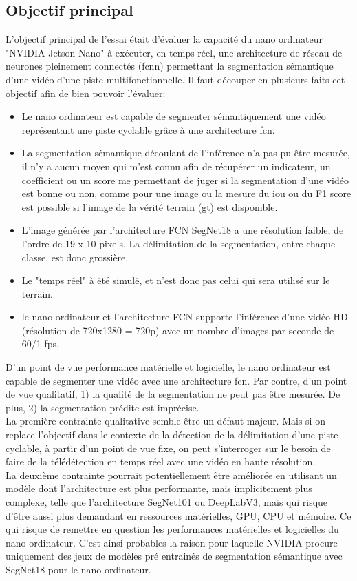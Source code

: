﻿\subsection{Objectif principal}
\noindent L'objectif principal de l'essai était d'évaluer la capacité du nano ordinateur "NVIDIA Jetson Nano" à exécuter, en temps réel, une architecture de réseau de neurones pleinement connectés (\acrshort{fcnn}) permettant la segmentation sémantique d'une vidéo d'une piste multifonctionnelle. Il faut découper en plusieurs faits cet objectif afin de bien pouvoir l'évaluer: 
\begin{itemize}
   \item Le nano ordinateur est capable de segmenter sémantiquement une vidéo représentant une piste cyclable grâce à une architecture \acrshort{fcn}. 
   \item La segmentation sémantique découlant de l'inférence n'a pas pu être mesurée, il n'y a aucun moyen qui m'est connu afin de récupérer un indicateur, un coefficient ou un score me permettant de juger si la segmentation d'une vidéo est bonne ou non, comme pour une image ou la mesure du \acrshort{iou} ou du F1 score est possible si l'image de la vérité terrain (\acrshort{gt}) est disponible. 
   \item L'image générée par l'architecture FCN SegNet18 a une résolution faible, de l'ordre de 19 x 10 pixels. La délimitation de la segmentation, entre chaque classe, est donc grossière.
   \item Le "temps réel" à été simulé, et n'est donc pas celui qui sera utilisé sur le terrain. 
   \item le nano ordinateur et l'architecture FCN supporte l'inférence d'une vidéo HD (résolution de 720x1280 = 720p) avec un nombre d'images par seconde de 60/1 \acrshort{fps}.
\end{itemize}
\vspace{\baselineskip}
\noindent D'un point de vue performance matérielle et logicielle, le nano ordinateur est capable de segmenter une vidéo avec une architecture \acrshort{fcn}. Par contre, d'un point de vue qualitatif, 1) la qualité de la segmentation ne peut pas être mesurée. De plus, 2) la segmentation prédite est imprécise.
\vspace{\baselineskip}
\\
\noindent La première contrainte qualitative semble être un défaut majeur. Mais si on replace l'objectif dans le contexte de la détection de la délimitation d'une piste cyclable, à partir d'un point de vue fixe, on peut s'interroger sur le besoin de faire de la télédétection en temps réel avec une vidéo en haute résolution.
\vspace{\baselineskip}
\\
\noindent La deuxième contrainte pourrait potentiellement être améliorée en utilisant un modèle dont l'architecture est plus performante, mais implicitement plus complexe, telle que l'architecture SegNet101 ou DeepLabV3, mais qui risque d'être aussi plus demandant en ressources matérielles, GPU, CPU et mémoire. Ce qui risque de remettre en question les performances matérielles et logicielles du nano ordinateur. C'est ainsi probables la raison pour laquelle NVIDIA procure uniquement des jeux de modèles pré entrainés de segmentation sémantique avec SegNet18 pour le nano ordinateur. 
